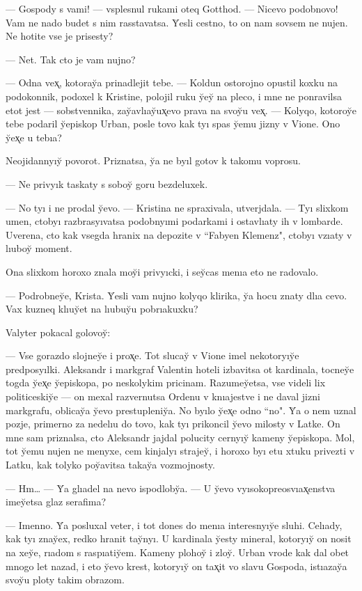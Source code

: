\documentclass[10pt]{book}
\begin{document}
— Gospody s vami! — vsplesnul rukami oteq Gotthod. — Nicevo podobnovo! Vam ne nado budet s nim rasstavatsa. Y̆esli cestno, to on nam sovsem ne nujen. Ne hotite vse je prisesty?

— Net. Tak cto je vam nujno?

— Odna vex̨, kotoray̆a prinadlejit tebe. — Koldun ostorojno opustil koxku na podokonnik, podoxel k Kristine, polojil ruku y̆ey̆ na pleco, i mne ne ponravilsa etot jest — sobstvennika, zay̆avlıay̆ux̨evo prava na svoy̆u vex̨. — Kolyqo, kotoroy̆e tebe podaril y̆episkop Urban, posle tovo kak tyı spas y̆emu jizny v Vione. Ono y̆ex̨e u tebıa?

Neojidannyıy̆ povorot. Priznatsa, y̆a ne byıl gotov k takomu voprosu.

— Ne privyık taskaty s soboy̆ goru bezdeluxek.

— No tyı i ne prodal y̆evo. — Kristina ne spraxivala, utverjdala. — Tyı slixkom umen, ctobyı razbrasyıvatsa podobnyımi podarkami i ostavlıaty ih v lombarde. Uverena, cto kak vsegda hranix na depozite v ``Fabyen Klemenz", ctobyı vzıaty v lıuboy̆ moment.

Ona slixkom horoxo znala moy̆i privyıcki, i sey̆cas menıa eto ne radovalo.

— Podrobney̆e, Krista. Y̆esli vam nujno kolyqo klirika, y̆a hocu znaty dlıa cevo. Vax kuzneq klıuy̆et na lıubuy̆u pobrıakuxku?

Valyter pokacal golovoy̆:

— Vse gorazdo slojney̆e i prox̨e. Tot slucay̆ v Vione imel nekotoryıy̆e predposyılki. Aleksandr i markgraf Valentin hoteli izbavitsa ot kardinala, tocney̆e togda y̆ex̨e y̆episkopa, po neskolykim pricinam. Razumey̆etsa, vse videli lix politiceskiy̆e — on mexal razvernutsa Ordenu v knıajestve i ne daval jizni markgrafu, oblicay̆a y̆evo prestupleniy̆a. No byılo y̆ex̨e odno ``no". Y̆a o nem uznal pozje, primerno za nedelıu do tovo, kak tyı prikoncil y̆evo milosty v Latke. On mne sam priznalsa, cto Aleksandr jajdal polucity cernyıy̆ kameny y̆episkopa. Mol, tot y̆emu nujen ne menyxe, cem kinjalyı strajey̆, i horoxo byı etu xtuku privezti v Latku, kak tolyko poy̆avitsa takay̆a vozmojnosty.

— Hm… — Y̆a glıadel na nevo ispodloby̆a. — U y̆evo vyısokopreosvıax̨enstva imey̆etsa glaz serafima?

— Imenno. Y̆a posluxal veter, i tot dones do menıa interesnyıy̆e sluhi. Celıady, kak tyı znay̆ex, redko hranit tay̆nyı. U kardinala y̆esty mineral, kotoryıy̆ on nosit na xey̆e, rıadom s raspıatiy̆em. Kameny plohoy̆ i zloy̆. Urban vrode kak dal obet mnogo let nazad, i eto y̆evo krest, kotoryıy̆ on tax̨it vo slavu Gospoda, istıazay̆a svoy̆u ploty takim obrazom.
\end{document}
